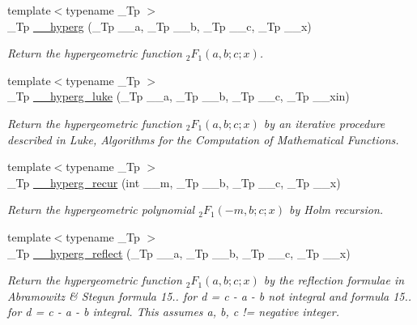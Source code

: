 \begin{DoxyCompactItemize}
\item 
{\footnotesize template$<$typename \+\_\+\+Tp $>$ }\\\+\_\+\+Tp \hyperlink{namespacestd_1_1____detail_a316589a60d5e5f50201c2d42b980678c}{\+\_\+\+\_\+hyperg} (\+\_\+\+Tp \+\_\+\+\_\+a, \+\_\+\+Tp \+\_\+\+\_\+b, \+\_\+\+Tp \+\_\+\+\_\+c, \+\_\+\+Tp \+\_\+\+\_\+x)
\begin{DoxyCompactList}\small\item\em Return the hypergeometric function $ {}_2F_1(a,b;c;x) $. \end{DoxyCompactList}\item 
{\footnotesize template$<$typename \+\_\+\+Tp $>$ }\\\+\_\+\+Tp \hyperlink{namespacestd_1_1____detail_a0c1ec62b5c39c93ad70a8229a7a6d84d}{\+\_\+\+\_\+hyperg\+\_\+luke} (\+\_\+\+Tp \+\_\+\+\_\+a, \+\_\+\+Tp \+\_\+\+\_\+b, \+\_\+\+Tp \+\_\+\+\_\+c, \+\_\+\+Tp \+\_\+\+\_\+xin)
\begin{DoxyCompactList}\small\item\em Return the hypergeometric function $ {}_2F_1(a,b;c;x) $ by an iterative procedure described in Luke, Algorithms for the Computation of Mathematical Functions. \end{DoxyCompactList}\item 
{\footnotesize template$<$typename \+\_\+\+Tp $>$ }\\\+\_\+\+Tp \hyperlink{namespacestd_1_1____detail_a945aec89969c51a4778c63eba8741fab}{\+\_\+\+\_\+hyperg\+\_\+recur} (int \+\_\+\+\_\+m, \+\_\+\+Tp \+\_\+\+\_\+b, \+\_\+\+Tp \+\_\+\+\_\+c, \+\_\+\+Tp \+\_\+\+\_\+x)
\begin{DoxyCompactList}\small\item\em Return the hypergeometric polynomial $ {}_2F_1(-m,b;c;x) $ by Holm recursion. \end{DoxyCompactList}\item 
{\footnotesize template$<$typename \+\_\+\+Tp $>$ }\\\+\_\+\+Tp \hyperlink{namespacestd_1_1____detail_a3c3baddc93bfaf1cb368d4b74e53542d}{\+\_\+\+\_\+hyperg\+\_\+reflect} (\+\_\+\+Tp \+\_\+\+\_\+a, \+\_\+\+Tp \+\_\+\+\_\+b, \+\_\+\+Tp \+\_\+\+\_\+c, \+\_\+\+Tp \+\_\+\+\_\+x)
\begin{DoxyCompactList}\small\item\em Return the hypergeometric function $ {}_2F_1(a,b;c;x) $ by the reflection formulae in Abramowitz \& Stegun formula 15.. for d = c -\/ a -\/ b not integral and formula 15.. for d = c -\/ a -\/ b integral. This assumes a, b, c != negative integer. \end{DoxyCompactList}\item 

\end{DoxyCompactItemize}

